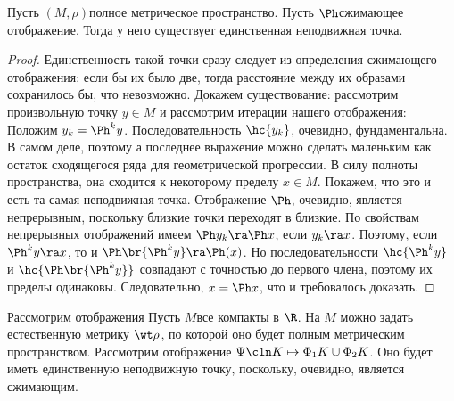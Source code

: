 \documentclass[a4paper]{article}
\begin{document}
\begin{theorem}
Пусть $(M, \rho)$\т полное метрическое пространство. Пусть $\Ph$\т сжимающее отображение.
Тогда у него существует единственная неподвижная точка.
\end{theorem}
\begin{proof}
Единственность такой точки сразу следует из определения сжимающего отображения: если бы их было две,
тогда расстояние между их образами сохранилось бы, что невозможно. Докажем существование:
рассмотрим произвольную точку $y \in M$ и рассмотрим итерации нашего отображения:
Положим $y_k = \Ph^k y$. Последовательность $\hc{y_k}$, очевидно, фундаментальна. В самом деле,
поэтому
а последнее выражение можно сделать маленьким как остаток сходящегося ряда для геометрической прогрессии.
В силу полноты пространства, она сходится к некоторому пределу $x \in M$.
Покажем, что это и есть та самая неподвижная точка.
Отображение $\Ph$, очевидно, является непрерывным, поскольку близкие точки переходят в близкие.
По свойствам непрерывных отображений имеем $\Ph y_k \ra \Ph x$, если $y_k \ra x$. Поэтому,
если $\Ph^k y \ra x$, то и $\Ph\br{\Ph^k y} \ra \Ph(x)$. Но последовательности
$\hc{\Ph^k y}$ и $\hc{\Ph\br{\Ph^k y}}$ совпадают с точностью до первого члена, поэтому их пределы
одинаковы. Следовательно, $x = \Ph x$, что и требовалось доказать.
\end{proof}

\begin{ex}
Рассмотрим отображения
Пусть $M$\т все компакты в $\R$. На $M$ можно задать естественную метрику $\wt\rho$,
по которой оно будет полным метрическим пространством.
Рассмотрим отображение $\Psi\cln K \mapsto \Phi_1 K \cup \Phi_2 K$. Оно будет иметь единственную неподвижную
точку, поскольку, очевидно, является сжимающим.
\end{ex}
\end{document}
